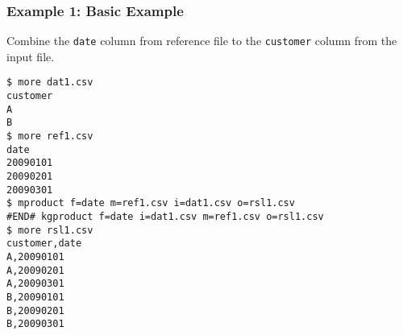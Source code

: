 \subsubsection*{Example 1: Basic Example}

Combine the \verb|date| column from reference file to the \verb|customer| column from the input file.


\begin{Verbatim}[baselinestretch=0.7,frame=single]
$ more dat1.csv
customer
A
B
$ more ref1.csv
date
20090101
20090201
20090301
$ mproduct f=date m=ref1.csv i=dat1.csv o=rsl1.csv
#END# kgproduct f=date i=dat1.csv m=ref1.csv o=rsl1.csv
$ more rsl1.csv
customer,date
A,20090101
A,20090201
A,20090301
B,20090101
B,20090201
B,20090301
\end{Verbatim}
